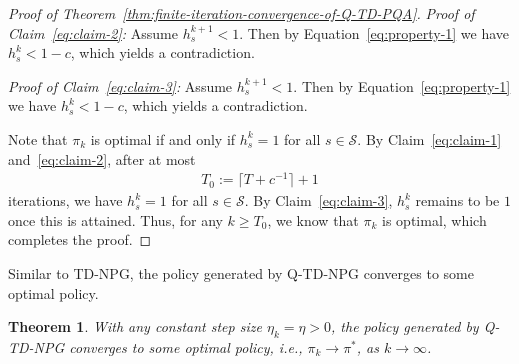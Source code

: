 \documentclass[10pt]{article}
\newcommand{\calS}{\mathcal{S}}
\theoremstyle{plain}
\newtheorem{theorem}{Theorem}[section]
\theoremstyle{definition}
\begin{document}
\begin{proof}[Proof of Theorem~\ref{thm:finite-iteration-convergence-of-Q-TD-PQA}]
    \textit{Proof of Claim~\ref{eq:claim-2}:} Assume $h_s^{k+1} < 1$. Then by Equation~\eqref{eq:property-1} we have $h_s^k < 1 - c$, which yields a contradiction.

    \textit{Proof of Claim~\ref{eq:claim-3}:} Assume $h_s^{k+1} < 1$. Then by Equation~\eqref{eq:property-1} we have $h_s^k < 1 - c$, which yields a contradiction.

  
  Note that $\pi_k$ is optimal if and only if $h_s^k = 1$ for all $s\in\calS$. By Claim~\ref{eq:claim-1} and~\ref{eq:claim-2}, after at most
    \begin{align*}
        T_0 := \lceil T + c^{-1} \rceil + 1
    \end{align*}
    iterations, we have $h_s^k = 1$ for all $s\in\calS$. By Claim~\ref{eq:claim-3}, $h_s^k$ remains  to be $1$ once this is attained. Thus, for any $k \geq T_0$, we know that $\pi_k$ is optimal, which completes the proof.
\end{proof}

Similar to TD-NPG, the policy generated by Q-TD-NPG converges to some optimal policy.

\begin{theorem}
    With any constant step size $\eta_k = \eta > 0$, the policy generated by Q-TD-NPG converges to some optimal policy, i.e., $\pi_k \to \pi^*$, as $k \to \infty$.
    \label{thm:policy-convergence-of-Q-TD-NPG}
\end{theorem}
\end{document}

